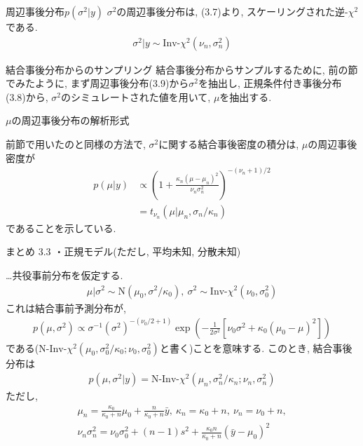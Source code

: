 \documentclass[10pt,dvipdfmx,a4]{beamer}
\newcommand{\eq}[1]{\begin{align}#1\end{align}}
\newcommand{\eqn}[1]{\begin{align*}#1\end{align*}}
\begin{document}

\begin{frame}{周辺事後分布$p(\sigma^2|y)$}
$\sigma^2$の周辺事後分布は, (3.7)より, スケーリングされた逆-$\chi^2$である.
\eq{\sigma^2|y\sim\text{Inv-}\chi^2(\nu_n,\sigma_n^2)}
\end{frame}


\begin{frame}{結合事後分布からのサンプリング}
結合事後分布からサンプルするために, 前の節でみたように, まず周辺事後分布(3.9)から$\sigma^2$を抽出し, 正規条件付き事後分布(3.8)から, $\sigma^2$のシミュレートされた値を用いて, $\mu$を抽出する.
\end{frame}


\begin{frame}{$\mu$の周辺事後分布の解析形式}

前節で用いたのと同様の方法で, $\sigma^2$に関する結合事後密度の積分は, $\mu$の周辺事後密度が
\eqn{p(\mu|y)&\propto \left(1+\frac{\kappa_n(\mu-\mu_n)^2}{\nu_n\sigma^2_n}\right)^{-(\nu_n+1)/2}\\
&=t_{\nu_n}(\mu|\mu_n,\sigma_n/\kappa_n)}
であることを示している.
\end{frame}


\begin{frame}{まとめ 3.3}
・正規モデル(ただし, 平均未知, 分散未知)

…共役事前分布を仮定する.
\eqn{\mu|\sigma^2\sim \text{N}(\mu_0,\sigma^2/\kappa_0),\ \sigma^2\sim \text{Inv-}\chi^2(\nu_0,\sigma_0^2)}
これは結合事前予測分布が,
\eqn{p(\mu,\sigma^2)\propto \sigma^{-1}(\sigma^2)^{-(\nu_0/2+1)}\exp\left(-\frac{1}{2\sigma^2}[\nu_0\sigma^2+\kappa_0(\mu_0-\mu)^2]\right)}
である($\text{N-Inv-}\chi^2(\mu_0,\sigma^2_0/\kappa_0;\nu_0,\sigma^2_0)$と書く)ことを意味する.
このとき, 結合事後分布は
\eqn{p(\mu,\sigma^2|y)=\text{N-Inv-}\chi^2(\mu_n,\sigma^2_n/\kappa_n;\nu_n,\sigma_n^2)}
ただし,
\eqn{\mu_n=\tfrac{\kappa_0}{\kappa_0+n}\mu_0+\tfrac{n}{\kappa_0+n}\bar{y},\ \kappa_n=\kappa_0+n,\ \nu_n=\nu_0+n,\\\nu_n\sigma_n^2=\nu_0\sigma^2_0+(n-1)s^2+\tfrac{\kappa_0n}{\kappa_0+n}(\bar{y}-\mu_0)^2}
\end{frame}

\end{document}
